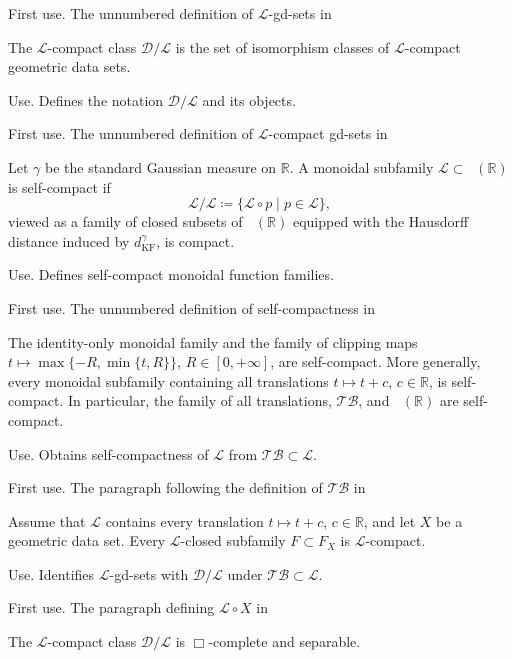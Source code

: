 \documentclass{amsart}
\theoremstyle{plain}
\theoremstyle{definition}
\theoremstyle{remark}
\newcommand{\R}{\mathbb{R}}
\newcommand{\D}{\mathcal{D}}
\renewcommand{\L}{\mathcal{L}}
\newcommand{\TB}{\mathcal{TB}}
\DeclareMathOperator{\lipone}{Lip_1}
\newcommand{\kf}{d_{\operatorname{KF}}}
\begin{document}
\begin{description}
\textup{First use.} The unnumbered definition of $\L$-gd-sets in 

\item[\cite{gds2}, Definition~3.8]
The $\L$-compact class $\D/\L$ is the set of isomorphism classes of $\L$-compact geometric data sets.

\textup{Use.} Defines the notation $\D/\L$ and its objects.

\textup{First use.} The unnumbered definition of $\L$-compact gd-sets in 

\item[\cite{gds2}, Definition~3.12]
Let $\gamma$ be the standard Gaussian measure on $\R$. A monoidal subfamily $\L\subset\lipone(\R)$ is self-compact if
\[\L/\L\coloneqq\{\L\circ p\mid p\in\L\},\]
viewed as a family of closed subsets of $\lipone(\R)$ equipped with the Hausdorff distance induced by $\kf^\gamma$, is compact.

\textup{Use.} Defines self-compact monoidal function families.

\textup{First use.} The unnumbered definition of self-compactness in 

\item[\cite{gds2}, Proposition~3.14]
The identity-only monoidal family and the family of clipping maps $t\mapsto\max\{-R,\min\{t,R\}\}$, $R\in[0,+\infty]$, are self-compact. More generally, every monoidal subfamily containing all translations $t\mapsto t+c$, $c\in\R$, is self-compact. In particular, the family of all translations, $\TB$, and $\lipone(\R)$ are self-compact.

\textup{Use.} Obtains self-compactness of $\L$ from $\TB\subset\L$.

\textup{First use.} The paragraph following the definition of $\TB$ in 

\item[\cite{gds2}, Theorem~3.19]
Assume that $\L$ contains every translation $t\mapsto t+c$, $c\in\R$, and let $X$ be a geometric data set. Every $\L$-closed subfamily $F\subset F_X$ is $\L$-compact.

\textup{Use.} Identifies $\L$-gd-sets with $\D/\L$ under $\TB\subset\L$.

\textup{First use.} The paragraph defining $\L\circ X$ in 

\item[\cite{gds2}, Theorem~4.10]
The $\L$-compact class $\D/\L$ is $\Box$-complete and separable.


\end{description}
\end{document}
